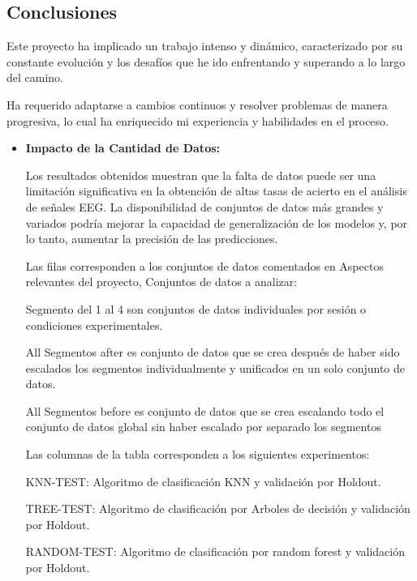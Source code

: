 
\subsection{Conclusiones}


Este proyecto ha implicado un trabajo intenso y dinámico, caracterizado por su constante evolución y los desafíos que he ido enfrentando y superando a lo largo del camino. 

Ha requerido adaptarse a cambios continuos y resolver problemas de manera progresiva, lo cual ha enriquecido mi experiencia y habilidades en el proceso.

\begin{itemize}
	
	\item
	\textbf{Impacto de la Cantidad de Datos:}
	
	Los resultados obtenidos muestran que la falta de datos puede ser una limitación significativa en la obtención de altas tasas de acierto en el análisis de señales EEG. La disponibilidad de conjuntos de datos más grandes y variados podría mejorar la capacidad de generalización de los modelos y, por lo tanto, aumentar la precisión de las predicciones.
	

	Las filas corresponden a los conjuntos de datos comentados en Aspectos relevantes del proyecto, Conjuntos de datos a analizar:
	
	Segmento del 1 al 4 son conjuntos de datos individuales por sesión o condiciones experimentales.
	
	All Segmentos after es conjunto de datos que se crea después de haber sido escalados los segmentos individualmente y unificados en un solo conjunto de datos.

	All Segmentos before es conjunto de datos que se crea escalando todo el conjunto de datos global sin haber escalado por separado los segmentos
	
	Las columnas de la tabla corresponden a los siguientes experimentos:
	
	KNN-TEST: Algoritmo de clasificación KNN y validación por Holdout.
	
	TREE-TEST: Algoritmo de clasificación por Arboles de decisión y validación por Holdout.

	RANDOM-TEST: Algoritmo de clasificación por random forest y validación por Holdout.


\end{itemize}
